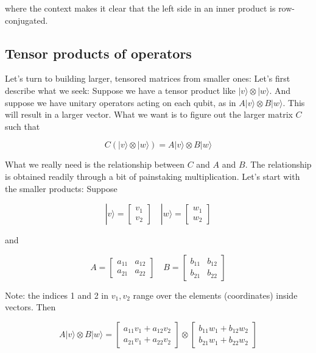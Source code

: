 \documentclass[main.tex]{subfiles}
\begin{document}
    where the context makes it clear that the left side in an inner product is row-conjugated.

\subsection{Tensor products of operators}

    Let's turn to building larger, tensored matrices from smaller ones: Let's first describe what we seek: Suppose we have a tensor product like $|v\rangle \otimes|w\rangle$. And suppose we have unitary operators acting on each qubit, as in $A|v\rangle \otimes B|w\rangle$. This will result in a larger vector. What we want is to figure out the larger matrix $C$ such that
    
    $$
    C(|v\rangle \otimes|w\rangle)=A|v\rangle \otimes B|w\rangle
    $$
    
    What we really need is the relationship between $C$ and $A$ and $B$. The relationship is obtained readily through a bit of painstaking multiplication. Let's start with the smaller products: Suppose
    
    $$
    |v\rangle=\left[\begin{array}{l}
    v_{1} \\
    v_{2}
    \end{array}\right] \quad|w\rangle=\left[\begin{array}{l}
    w_{1} \\
    w_{2}
    \end{array}\right]
    $$
    
    and
    
    $$
    A=\left[\begin{array}{ll}
    a_{11} & a_{12} \\
    a_{21} & a_{22}
    \end{array}\right] \quad B=\left[\begin{array}{ll}
    b_{11} & b_{12} \\
    b_{21} & b_{22}
    \end{array}\right]
    $$
    
    Note: the indices 1 and 2 in $v_{1}, v_{2}$ range over the elements (coordinates) inside vectors. Then
    
    $$
    A|v\rangle \otimes B|w\rangle=\left[\begin{array}{l}
    a_{11} v_{1}+a_{12} v_{2} \\
    a_{21} v_{1}+a_{22} v_{2}
    \end{array}\right] \otimes\left[\begin{array}{l}
    b_{11} w_{1}+b_{12} w_{2} \\
    b_{21} w_{1}+b_{22} w_{2}
    \end{array}\right]
    $$
    
\end{document}
